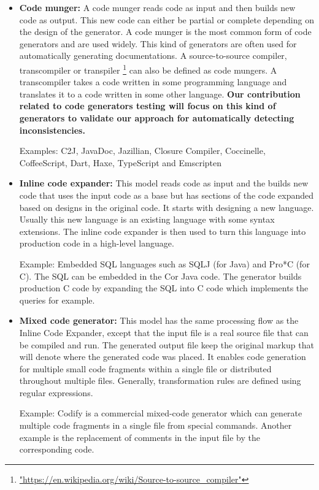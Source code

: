 \begin{itemize}
\item \textbf{Code munger:} A code munger reads code as input and then builds new code as output. This new code can either be partial or complete depending on the design of the generator.
A code munger is the most common form of code generators and are used widely. This kind of generators are often used for automatically generating documentations.
A source-to-source compiler, transcompiler or transpiler \footnote{\url{"https://en.wikipedia.org/wiki/Source-to-source_compiler"}} can also be defined as code mungers. A transcompiler takes a code written in some programming language and translates it to a code written in some other language. \textbf{Our contribution related to code generators testing will focus on this kind of generators to validate our approach for automatically detecting inconsistencies.}

Examples:  C2J, JavaDoc, Jazillian, Closure Compiler, Coccinelle, CoffeeScript, Dart, Haxe, TypeScript and Emscripten



\item \textbf{Inline code expander:} This model reads code as input and the builds new code that uses the input code as a base but has sections of the code expanded based on designs in the original code. 
It starts with designing a new language. Usually this new language is an existing language with some syntax extensions. The inline code expander is then used to turn this language into production code in a high-level language.

Example: Embedded SQL languages such as SQLJ (for Java) and Pro*C (for C). The SQL can be embedded in the Cor Java code. The generator builds production C code by expanding the SQL into C code which implements the queries for example.

\item \textbf{Mixed code generator:} This model has the same processing flow as the Inline Code Expander, except that the input file is a real source file that can be compiled and run. The generated output file keep the original markup that will denote where the generated code was placed. It enables code generation for multiple small code fragments within a single file or distributed throughout multiple files. Generally, transformation rules are defined using regular expressions.


Example: Codify is a commercial mixed-code generator which can generate multiple code fragments in a single file from special commands. Another example is the replacement of comments in the input file by the corresponding code.


\end{itemize}
